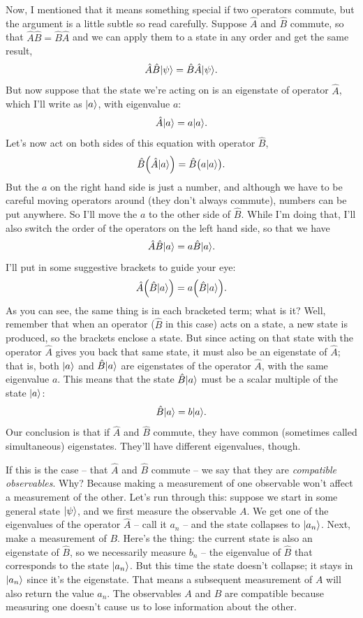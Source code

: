 Now, I mentioned that it means something special if two operators commute, but the argument is a little subtle so read carefully.  Suppose $\hat{A}$ and $\hat{B}$ commute, so that $\hat{A}\hat{B} = \hat{B}\hat{A}$ and we can apply them to a state in any order and get the same result,
\[
\hat{A}\hat{B} | \psi \rangle = \hat{B} \hat{A} | \psi \rangle.
\]
But now suppose that the state we're acting on is an eigenstate of operator $\hat{A}$, which I'll write as $| a \rangle$, with eigenvalue $a$:
\[
\hat{A} | a \rangle = a | a \rangle.
\]
Let's now act on both sides of this equation with operator $\hat{B}$,
\[
\hat{B} \Big( \hat{A} | a \rangle \Big) = \hat{B} \big( a | a \rangle \big) .
\]
But the $a$ on the right hand side is just a number, and although we have to be careful moving operators around (they don't always commute), numbers can be put anywhere.  So I'll move the $a$ to the other side of $\hat{B}$.  While I'm doing that, I'll also switch the order of the operators on the left hand side, so that we have
\[
\hat{A} \hat{B} | a \rangle = a \hat{B} | a \rangle.
\]
I'll put in some suggestive brackets to guide your eye:
\[
\hat{A} \Big( \hat{B} | a \rangle \Big) = a \Big( \hat{B} | a \rangle \Big).
\]
As you can see, the same thing is in each bracketed term; what is it?  Well, remember that when an operator ($\hat{B}$ in this case) acts on a state, a new state is produced, so the brackets enclose a state.  But since acting on that state with the operator $\hat{A}$ gives you back that same state, it must also be an eigenstate of $\hat{A}$; that is, both $| a \rangle$ and $\hat{B}| a \rangle$ are eigenstates of the operator $\hat{A}$, with the same eigenvalue $a$.  This means that the state $\hat{B} | a \rangle$ must be a scalar multiple of the state $| a \rangle$:
\[
\hat{B} | a \rangle = b | a \rangle.
\]
Our conclusion is that if $\hat{A}$ and $\hat{B}$ commute, they have common (sometimes called simultaneous) eigenstates.  They'll have different eigenvalues, though.

If this is the case -- that $\hat{A}$ and $\hat{B}$ commute -- we say that they are \emph{compatible observables}.  Why?  Because making a measurement of one observable won't affect a measurement of the other.  Let's run through this:  suppose we start in some general state $| \psi \rangle$, and we first measure the observable $A$.  We get one of the eigenvalues of the operator $\hat{A}$ -- call it $a_n$ -- and the state collapses to $| a_n \rangle$.  Next, make a measurement of $B$.  Here's the thing:  the current state is also an eigenstate of $\hat{B}$, so we necessarily measure $b_n$ -- the eigenvalue of $\hat{B}$ that corresponds to the state $| a_n \rangle$.  But this time the state doesn't collapse; it stays in $| a_n \rangle$ since it's the eigenstate.  That means a subsequent measurement of $A$ will also return the value $a_n$.  The observables $A$ and $B$ are compatible because measuring one doesn't cause us to lose information about the other.


